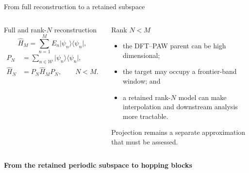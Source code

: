 \documentclass[aspectratio=169,10pt]{beamer}
\begin{document}
\begin{frame}{From full reconstruction to a retained subspace}
  \small
  \begin{columns}[T]
      \begin{block}{Full and rank-$N$ reconstruction}
        \[
          \hat H_M=\sum_{n=1}^{M}E_n
          \lvert\psi_n\rangle\langle\psi_n\rvert,
        \]
        \[
          \begin{aligned}
            P_N&=\sum_{n\in\mathcal W}
            \lvert\psi_n\rangle\langle\psi_n\rvert,\\
            \hat H_N&=P_N\hat H_M P_N,\qquad N<M.
          \end{aligned}
        \]
      \end{block}
      \begin{exampleblock}{Rank $N<M$}
        \begin{itemize}
          \setlength{\itemsep}{0.15em}
          \item the DFT--PAW parent can be high dimensional;
          \item the target may occupy a frontier-band window; and
          \item a retained rank-$N$ model can make interpolation and downstream
            analysis more tractable.
        \end{itemize}
        Projection remains a separate approximation that must be assessed.
      \end{exampleblock}
  \end{columns}
  \vspace{0.55em}
  \centering
  {\large\bfseries\color{dlsudarkgreen}
  From the retained periodic subspace to hopping blocks\par}
  \vspace{0.35em}
\end{frame}
\end{document}
